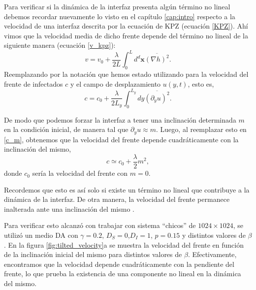 
Para verificar si la dinámica de la interfaz presenta algún término no lineal debemos recordar nuevamente lo visto en el capítulo \ref{cap:intro} respecto a la velocidad de una interfaz descrita por la ecuación de KPZ (ecuación \ref{KPZ}). Ahí vimos que la velocidad media de dicho frente depende del término no lineal de la siguiente manera (ecuación \ref{v_kpz}):
\begin{equation}
    v = v_0 + \frac{\lambda}{2L} \int_0^L d^d\mathbf{x} \overline{\left(\nabla h\right)^2}.
\end{equation}
Reemplazando por la notación que hemos estado utilizando para la velocidad del frente de infectados $c$ y el campo de desplazamiento $u(y,t)$, esto es,
\begin{equation}
    c = c_0 + \frac{\lambda}{2L_y} \int_0^{L_y} dy \overline{\left(\partial_y u\right)^2}.
    \label{c_m}
\end{equation}

De modo que podemos forzar la interfaz a tener una inclinación determinada $m$ en la condición inicial, de manera tal que $\partial_y u \approx m$. Luego, al reemplazar esto en \ref{c_m}, obtenemos que la velocidad del frente depende cuadráticamente con la inclinación del mismo,
\begin{equation}
    c \simeq c_0 + \frac{\lambda}{2} m^2,
\end{equation}
donde $c_0$ sería la velocidad del frente con $m=0$.

Recordemos que esto es así solo si existe un término no lineal que contribuye a la dinámica de la interfaz. De otra manera, la velocidad del frente permanece inalterada ante una inclinación del mismo \cite{barabasi,krug1990mechanism}.

Para verificar esto alcanzó con trabajar con sistema ``chicos'' de $1024\times1024$, se utilizó un medio DA con $\gamma = 0.2$, $D_S = 0$,$D_I=1$, $p=0.15$ y distintos valores de $\beta$. En la figura \ref{fig:tilted_velocity}a se muestra la velocidad del frente en función de la inclinación inicial del mismo para distintos valores de $\beta$. Efectivamente, encontramos que la velocidad depende cuadráticamente con la pendiente del frente, lo que prueba la existencia de una componente no lineal en la dinámica del mismo.

